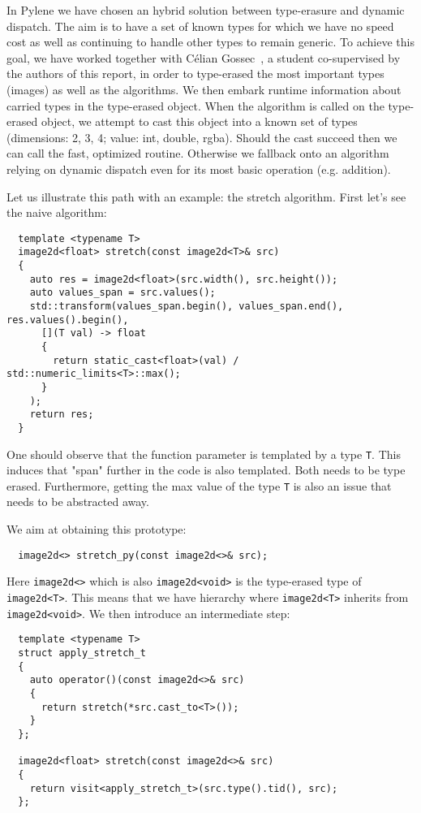 

In Pylene we have chosen an hybrid solution between type-erasure and dynamic dispatch. The aim is to have a set of known
types for which we have no speed cost as well as continuing to handle other types to remain generic. To achieve this
goal, we have worked together with Célian Gossec~\cite{gossec.2019.pybind}, a student co-supervised by the authors of
this report, in order to type-erased the most important types (images) as well as the algorithms. We then embark runtime
information about carried types in the type-erased object. When the algorithm is called on the type-erased object, we
attempt to cast this object into a known set of types (dimensions: 2, 3, 4; value: int, double, rgba). Should the cast
succeed then we can call the fast, optimized routine. Otherwise we fallback onto an algorithm relying on dynamic
dispatch even for its most basic operation (e.g. addition).

Let us illustrate this path with an example: the stretch algorithm. First let's see the naive algorithm:
\begin{verbatim}
  template <typename T>
  image2d<float> stretch(const image2d<T>& src)
  {
    auto res = image2d<float>(src.width(), src.height());
    auto values_span = src.values();
    std::transform(values_span.begin(), values_span.end(), res.values().begin(),
      [](T val) -> float
      {
        return static_cast<float>(val) / std::numeric_limits<T>::max();
      }
    );
    return res;
  }
\end{verbatim}

One should observe that the function parameter is templated by a type \texttt{T}. This induces that "span" further in
the code is also templated. Both needs to be type erased. Furthermore, getting the max value of the type \texttt{T} is
also an issue that needs to be abstracted away.

We aim at obtaining this prototype:

\begin{verbatim}
  image2d<> stretch_py(const image2d<>& src);
\end{verbatim}

Here \texttt{image2d<>} which is also \texttt{image2d<void>} is the type-erased type of \texttt{image2d<T>}. This means
that we have hierarchy where \texttt{image2d<T>} inherits from \texttt{image2d<void>}. We then introduce an intermediate
step:

\begin{verbatim}
  template <typename T>
  struct apply_stretch_t
  {
    auto operator()(const image2d<>& src)
    {
      return stretch(*src.cast_to<T>());
    }
  };

  image2d<float> stretch(const image2d<>& src)
  {
    return visit<apply_stretch_t>(src.type().tid(), src);
  };
\end{verbatim}

